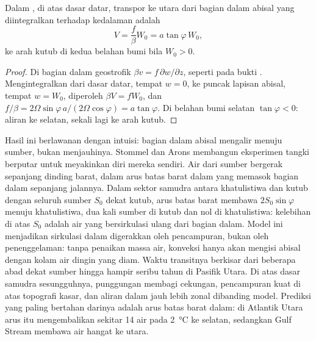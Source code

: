 \begin{proposition}\label{prop:b3:ocean-dynamics:abyssal}
Dalam , di atas dasar datar, transpor ke utara
dari bagian dalam abisal yang diintegralkan terhadap kedalaman adalah
\[
V = \frac{f}{\beta}W_0 = a\tan\varphi\,W_0 ,
\]
ke arah kutub di kedua belahan bumi bila $W_0 > 0$.
\end{proposition}

\begin{proof}
Di bagian dalam geostrofik $\beta v = f\,\partial w/\partial z$, seperti pada
bukti . Mengintegralkan dari dasar datar, tempat
$w = 0$, ke puncak lapisan abisal, tempat $w = W_0$, diperoleh $\beta V =
fW_0$, dan $f/\beta = 2\Omega\sin\varphi\,a/(2\Omega\cos\varphi) =
a\tan\varphi$. Di belahan bumi selatan $\tan\varphi < 0$: aliran
ke selatan, sekali lagi ke arah kutub.
\end{proof}

Hasil ini berlawanan dengan intuisi: bagian dalam abisal mengalir menuju
sumber, bukan menjauhinya. Stommel dan Arons membangun eksperimen tangki berputar
untuk meyakinkan diri mereka sendiri. Air dari sumber bergerak
sepanjang dinding barat, dalam arus batas barat dalam yang memasok
bagian dalam sepanjang jalannya. Dalam sektor samudra antara khatulistiwa dan kutub
dengan seluruh sumber $S_0$ dekat kutub, arus batas barat
membawa $2S_0\sin\varphi$ menuju khatulistiwa, dua kali sumber di kutub
dan nol di khatulistiwa: kelebihan di atas $S_0$ adalah air yang bersirkulasi ulang
dari bagian dalam. Model ini menjadikan sirkulasi dalam digerakkan oleh pencampuran,
bukan oleh penenggelaman: tanpa penaikan massa air, konveksi hanya akan mengisi
abisal dengan kolam air dingin yang diam. Waktu transitnya berkisar dari
beberapa abad dekat sumber hingga hampir seribu tahun di Pasifik
Utara. Di atas dasar samudra sesungguhnya, punggungan membagi cekungan, pencampuran
kuat di atas topografi kasar, dan aliran dalam jauh lebih zonal dibanding
model. Prediksi yang paling bertahan darinya adalah arus batas barat dalam: di
Atlantik Utara arus itu mengembalikan sekitar \qty{14}{\sverdrup} air
pada \qty{2}{\celsius} ke selatan, sedangkan Gulf Stream membawa air
hangat ke utara.

